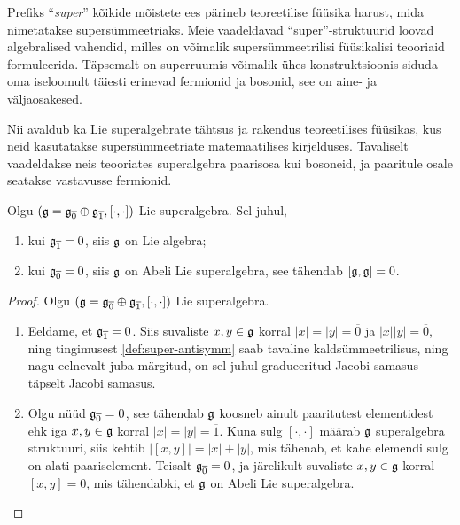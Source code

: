 \begin{markus}
    Prefiks "`\emph{super}"' kõikide mõistete ees pärineb teoreetilise füüsika
    harust, mida nimetatakse supersümmeetriaks. Meie vaadeldavad
    "`super"'-struktuurid loovad algebralised vahendid, milles on
    võimalik supersümmeetrilisi füüsikalisi teooriaid formuleerida.
    Täpsemalt on superruumis võimalik ühes konstruktsioonis siduda oma
    iseloomult täiesti erinevad fermionid ja bosonid, see on aine- ja
    väljaosakesed.

    Nii avaldub ka Lie superalgebrate tähtsus ja rakendus teoreetilises
    füüsikas, kus neid kasutatakse supersümmeetriate matemaatilises
    kirjelduses. Tavaliselt vaadeldakse neis teooriates superalgebra
    paarisosa kui bosoneid, ja paaritule osale seatakse vastavusse fermionid.
\end{markus}

\begin{lau}\label{lause:null-otseliidetav}
    Olgu $(\mathfrak{g} = \mathfrak{g}_{\overline{0}} \oplus \mathfrak{g}_{\overline{1}}, [\cdot, \cdot])$
    Lie superalgebra. Sel juhul,
    \begin{enumerate}[label=\arabic*)]
        \item kui $\mathfrak{g}_{\overline{1}} = 0$, siis $\mathfrak{g}$ on Lie algebra;
        \item kui $\mathfrak{g}_{\overline{0}} = 0$, siis $\mathfrak{g}$ on Abeli Lie
            superalgebra, see tähendab $[\mathfrak{g}, \mathfrak{g}] = 0$.
    \end{enumerate}
\end{lau}

\begin{proof}
    Olgu $(\mathfrak{g} = \mathfrak{g}_{\overline{0}} \oplus \mathfrak{g}_{\overline{1}}, [\cdot, \cdot])$
    Lie superalgebra.
    \begin{enumerate}[label=\arabic*)]
        \item Eeldame, et $\mathfrak{g}_{\overline{1}} = 0$. Siis suvaliste
            $x, y \in \mathfrak{g}$ korral $|x| = |y| = \overline{0}$ ja
            $|x||y| = \overline{0}$, ning tingimusest
            \eqref{def:super-antisymm} saab tavaline kaldsümmeetrilisus,
            ning nagu eelnevalt juba märgitud, on sel juhul gradueeritud
            Jacobi samasus täpselt Jacobi samasus.
        \item Olgu nüüd $\mathfrak{g}_{\overline{0}} = 0$, see tähendab $\mathfrak{g}$ koosneb
            ainult paaritutest elementidest ehk iga $x, y \in \mathfrak{g}$ korral
            $|x| = |y| = \overline{1}$. Kuna sulg $[\cdot, \cdot]$
            määrab $\mathfrak{g}$ superalgebra struktuuri, siis kehtib
            $\left| [x, y] \right| = |x| + |y|$, mis tähenab, et
            kahe elemendi sulg on alati paariselement. Teisalt
            $\mathfrak{g}_{\overline{0}} = 0$, ja järelikult suvaliste $x, y \in \mathfrak{g}$
            korral $[x, y] = 0$, mis tähendabki, et $\mathfrak{g}$ on Abeli
            Lie superalgebra.
    \end{enumerate}
\end{proof}

